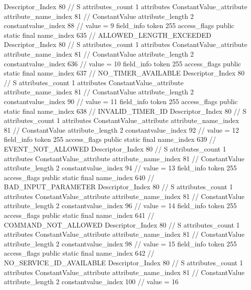 {{{{{				Descriptor_Index	80		// S
				attributes_count	1
				attributes {
				ConstantValue_attribute {
					attribute_name_index	81		// ConstantValue
					attribute_length	2
					constantvalue_index	88		// value = 9
				}
				}
			}
			field_info {
				token	255
				access_flags	public static final
				name_index	635		// ALLOWED_LENGTH_EXCEEDED
				Descriptor_Index	80		// S
				attributes_count	1
				attributes {
				ConstantValue_attribute {
					attribute_name_index	81		// ConstantValue
					attribute_length	2
					constantvalue_index	636		// value = 10
				}
				}
			}
			field_info {
				token	255
				access_flags	public static final
				name_index	637		// NO_TIMER_AVAILABLE
				Descriptor_Index	80		// S
				attributes_count	1
				attributes {
				ConstantValue_attribute {
					attribute_name_index	81		// ConstantValue
					attribute_length	2
					constantvalue_index	90		// value = 11
				}
				}
			}
			field_info {
				token	255
				access_flags	public static final
				name_index	638		// INVALID_TIMER_ID
				Descriptor_Index	80		// S
				attributes_count	1
				attributes {
				ConstantValue_attribute {
					attribute_name_index	81		// ConstantValue
					attribute_length	2
					constantvalue_index	92		// value = 12
				}
				}
			}
			field_info {
				token	255
				access_flags	public static final
				name_index	639		// EVENT_NOT_ALLOWED
				Descriptor_Index	80		// S
				attributes_count	1
				attributes {
				ConstantValue_attribute {
					attribute_name_index	81		// ConstantValue
					attribute_length	2
					constantvalue_index	94		// value = 13
				}
				}
			}
			field_info {
				token	255
				access_flags	public static final
				name_index	640		// BAD_INPUT_PARAMETER
				Descriptor_Index	80		// S
				attributes_count	1
				attributes {
				ConstantValue_attribute {
					attribute_name_index	81		// ConstantValue
					attribute_length	2
					constantvalue_index	96		// value = 14
				}
				}
			}
			field_info {
				token	255
				access_flags	public static final
				name_index	641		// COMMAND_NOT_ALLOWED
				Descriptor_Index	80		// S
				attributes_count	1
				attributes {
				ConstantValue_attribute {
					attribute_name_index	81		// ConstantValue
					attribute_length	2
					constantvalue_index	98		// value = 15
				}
				}
			}
			field_info {
				token	255
				access_flags	public static final
				name_index	642		// NO_SERVICE_ID_AVAILABLE
				Descriptor_Index	80		// S
				attributes_count	1
				attributes {
				ConstantValue_attribute {
					attribute_name_index	81		// ConstantValue
					attribute_length	2
					constantvalue_index	100		// value = 16
}}}}}}}
